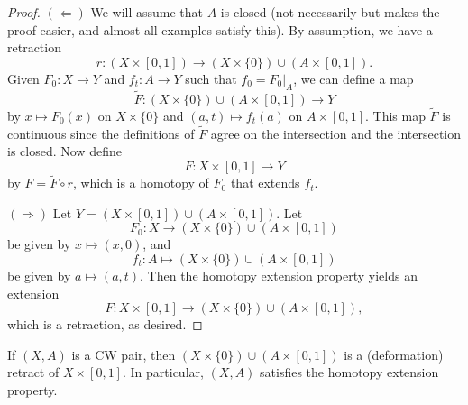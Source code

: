 \begin{proof}
  $(\Leftarrow)$ We will assume that $A$ is closed
  (not necessarily but makes the proof easier, and almost
  all examples satisfy this). By assumption, we
  have a retraction
  \[
    r : (X \times [0, 1]) \to (X \times \{0\}) \cup (A \times [0, 1]).
  \]
  Given $F_0 : X \to Y$ and $f_t : A \to Y$
  such that $f_0 = F_0|_A$, we can define a map
  \[
    \widetilde{F} : (X \times \{0\}) \cup (A \times [0, 1]) \to Y
  \]
  by $x \mapsto F_0(x)$ on $X \times \{0\}$ and
  $(a, t) \mapsto f_t(a)$ on $A \times [0, 1]$.
  This map $\widetilde{F}$ is continuous since the definitions of
  $\widetilde{F}$ agree on the intersection and the
  intersection is closed. Now define
  \[F : X \times [0, 1] \to Y\]
  by $F = \widetilde{F} \circ r$,
  which is a homotopy of $F_0$ that extends $f_t$.

  $(\Rightarrow)$ Let $Y = (X \times [0, 1]) \cup (A \times [0, 1])$. Let
  \[F_0 : X \to (X \times \{0\}) \cup (A \times [0, 1])\]
  be given by $x \mapsto (x, 0)$, and
  \[
    f_t : A \mapsto (X \times \{0\}) \cup (A \times [0, 1])
  \]
  be given by $a \mapsto (a, t)$. Then the homotopy
  extension property yields an extension
  \[F : X \times [0, 1] \to (X \times \{0\}) \cup (A \times [0, 1]),\]
  which is a retraction, as desired.
\end{proof}

\begin{lemma}\label{lem:lemma-5}
  If $(X, A)$ is a CW pair, then
  $(X \times \{0\}) \cup (A \times [0, 1])$ is a
  (deformation) retract of $X \times [0, 1]$.
  In particular, $(X, A)$ satisfies the homotopy
  extension property.
\end{lemma}

